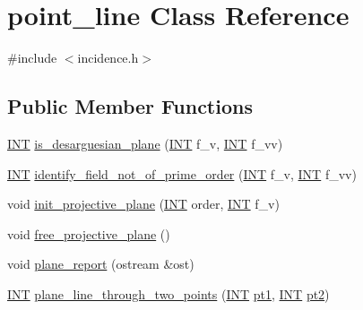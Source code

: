 \hypertarget{classpoint__line}{}\section{point\+\_\+line Class Reference}
\label{classpoint__line}


{\ttfamily \#include $<$incidence.\+h$>$}

\subsection*{Public Member Functions}
\begin{DoxyCompactItemize}
\item 
\mbox{\hyperlink{galois_8h_a09fddde158a3a20bd2dcadb609de11dc}{I\+NT}} \mbox{\hyperlink{classpoint__line_a664189dde33698267c4c82b1ee3aa401}{is\+\_\+desarguesian\+\_\+plane}} (\mbox{\hyperlink{galois_8h_a09fddde158a3a20bd2dcadb609de11dc}{I\+NT}} f\+\_\+v, \mbox{\hyperlink{galois_8h_a09fddde158a3a20bd2dcadb609de11dc}{I\+NT}} f\+\_\+vv)
\item 
\mbox{\hyperlink{galois_8h_a09fddde158a3a20bd2dcadb609de11dc}{I\+NT}} \mbox{\hyperlink{classpoint__line_aae394019ab60bbb77ee98aaf17c671f4}{identify\+\_\+field\+\_\+not\+\_\+of\+\_\+prime\+\_\+order}} (\mbox{\hyperlink{galois_8h_a09fddde158a3a20bd2dcadb609de11dc}{I\+NT}} f\+\_\+v, \mbox{\hyperlink{galois_8h_a09fddde158a3a20bd2dcadb609de11dc}{I\+NT}} f\+\_\+vv)
\item 
void \mbox{\hyperlink{classpoint__line_a48c51e9ec6c9a7c80847ecb9feffc03c}{init\+\_\+projective\+\_\+plane}} (\mbox{\hyperlink{galois_8h_a09fddde158a3a20bd2dcadb609de11dc}{I\+NT}} order, \mbox{\hyperlink{galois_8h_a09fddde158a3a20bd2dcadb609de11dc}{I\+NT}} f\+\_\+v)
\item 
void \mbox{\hyperlink{classpoint__line_aba056e804e457ed0c563b294169edac6}{free\+\_\+projective\+\_\+plane}} ()
\item 
void \mbox{\hyperlink{classpoint__line_aba3d273ac380fda6135d9376be29c1bc}{plane\+\_\+report}} (ostream \&ost)
\item 
\mbox{\hyperlink{galois_8h_a09fddde158a3a20bd2dcadb609de11dc}{I\+NT}} \mbox{\hyperlink{classpoint__line_af406b650e9e83872857248db151bac79}{plane\+\_\+line\+\_\+through\+\_\+two\+\_\+points}} (\mbox{\hyperlink{galois_8h_a09fddde158a3a20bd2dcadb609de11dc}{I\+NT}} \mbox{\hyperlink{clique__finder_8_c_ae170b0dc139c709e902c286671b94cba}{pt1}}, \mbox{\hyperlink{galois_8h_a09fddde158a3a20bd2dcadb609de11dc}{I\+NT}} \mbox{\hyperlink{clique__finder_8_c_a94324c2f74f64c974008fbc2faeda805}{pt2}})

\end{DoxyCompactItemize}
